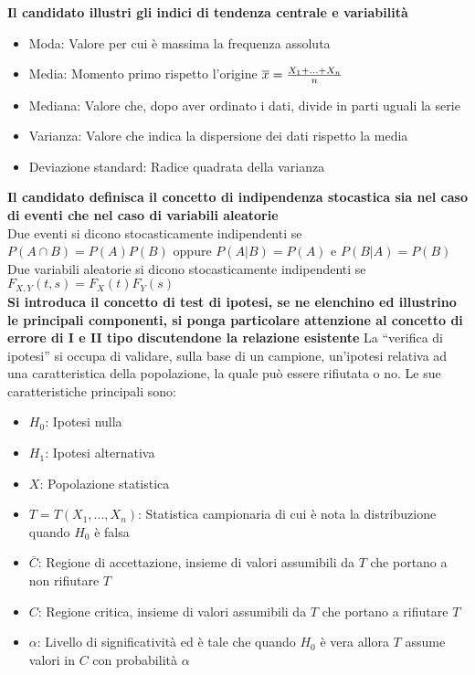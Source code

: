 \documentclass[12pt]{article}
\begin{document}
    \noindent\textbf{Il candidato illustri gli indici di tendenza centrale e variabilità}
    \begin{itemize}
        \item Moda: Valore per cui è massima la frequenza assoluta
        \item Media: Momento primo rispetto l'origine $\overline{x} = {X_1 + ... + X_n \over n}$
        \item Mediana: Valore che, dopo aver ordinato i dati, divide in parti uguali la serie
        \item Varianza: Valore che indica la dispersione dei dati rispetto la media
        \item Deviazione standard: Radice quadrata della varianza
    \end{itemize}
    
    \noindent\textbf{Il candidato definisca il concetto di indipendenza stocastica sia nel caso di eventi che nel caso di variabili aleatorie}
    \\Due eventi si dicono stocasticamente indipendenti se $P(A \cap B) = P(A)P(B)$ oppure $P(A|B)=P(A)$ e $P(B|A) = P(B)$
    \\Due variabili aleatorie si dicono stocasticamente indipendenti se $F_{X,Y}(t, s) = F_X(t)F_Y(s)$
    \\[12pt]
    \textbf{Si introduca il concetto di test di ipotesi, se ne elenchino ed illustrino le principali componenti, si ponga particolare attenzione al concetto di errore di I e II tipo discutendone la relazione esistente}
    La “verifica di ipotesi” si occupa di validare, sulla base di un campione, un’ipotesi relativa ad una caratteristica della popolazione, la quale può essere rifiutata o no. Le sue caratteristiche principali sono:
    \begin{itemize}
        \item $H_0$: Ipotesi nulla
        \item $H_1$: Ipotesi alternativa
        \item $X$: Popolazione statistica
        \item $T = T(X_1, ..., X_n)$: Statistica campionaria di cui è nota la distribuzione quando $H_0$ è falsa
        \item $\overline{C}$: Regione di accettazione, insieme di valori assumibili da $T$ che portano a non rifiutare $T$
        \item $C$: Regione critica, insieme di valori assumibili da $T$ che portano a rifiutare $T$
        \item $\alpha$: Livello di significatività ed è tale che quando $H_0$ è vera allora $T$ assume valori in $C$ con probabilità $\alpha$
    \end{itemize}
\end{document}
